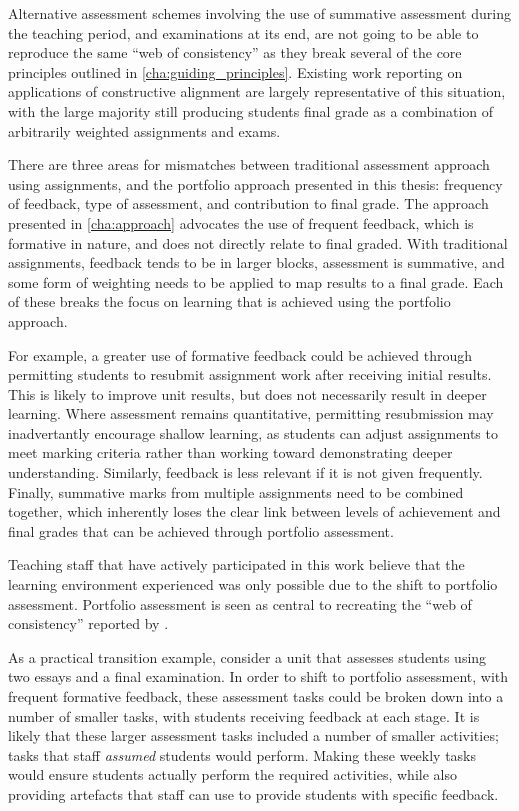 Alternative assessment schemes involving the use of summative assessment during the teaching period, and examinations at its end, are not going to be able to reproduce the same ``web of consistency'' as they break several of the core principles outlined in \cref{cha:guiding_principles}. Existing work reporting on applications of constructive alignment are largely representative of this situation, with the large majority still producing students final grade as a combination of arbitrarily weighted assignments and exams. 

There are three areas for mismatches between traditional assessment approach using assignments, and the portfolio approach presented in this thesis: frequency of feedback, type of assessment, and contribution to final grade. The approach presented in \cref{cha:approach} advocates the use of frequent feedback, which is formative in nature, and does not directly relate to final graded. With traditional assignments, feedback tends to be in larger blocks, assessment is summative, and some form of weighting needs to be applied to map results to a final grade. Each of these breaks the focus on learning that is achieved using the portfolio approach.

For example, a greater use of formative feedback could be achieved through permitting students to resubmit assignment work after receiving initial results. This is likely to improve unit results, but does not necessarily result in deeper learning. Where assessment remains quantitative, permitting resubmission may inadvertantly encourage shallow learning, as students can adjust assignments to meet marking criteria rather than working toward demonstrating deeper understanding. Similarly, feedback is less relevant if it is not given frequently. Finally, summative marks from multiple assignments need to be combined together, which inherently loses the clear link between levels of achievement and final grades that can be achieved through portfolio assessment.

Teaching staff that have actively participated in this work believe that the learning environment experienced was only possible due to the shift to portfolio assessment. Portfolio assessment is seen as central to recreating the ``web of consistency'' reported by \citet{Biggs:1996c,Biggs:1999}.

As a practical transition example, consider a unit that assesses students using two essays and a final examination. In order to shift to portfolio assessment, with frequent formative feedback, these assessment tasks could be broken down into a number of smaller tasks, with students receiving feedback at each stage. It is likely that these larger assessment tasks included a number of smaller activities; tasks that staff \emph{assumed} students would perform. Making these weekly tasks would ensure students actually perform the required activities, while also providing artefacts that staff can use to provide students with specific feedback.

